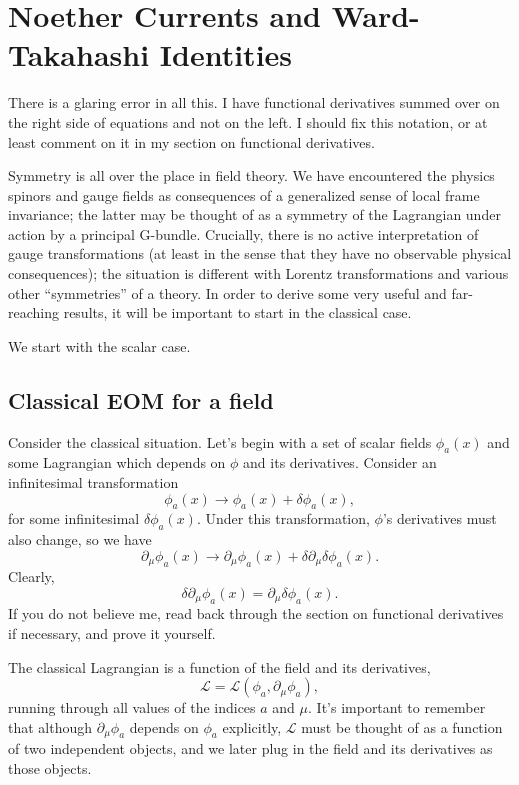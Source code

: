 \documentclass[main.tex]{subfiles}
\begin{document}
\chapter{Noether Currents and Ward-Takahashi Identities}

There is a glaring error in all this. I have functional derivatives summed over on the right side of equations and not on the left. I should fix this notation, or at least comment on it in my section on functional derivatives.


Symmetry is all over the place in field theory. We have encountered the physics spinors and gauge fields as consequences of a generalized sense of local frame invariance; the latter may be thought of as a symmetry of the Lagrangian under action by a principal G-bundle. Crucially, there is no active interpretation of gauge transformations (at least in the sense that they have no observable physical consequences); the situation is different with Lorentz transformations and various other ``symmetries'' of a theory. In order to derive some very useful and far-reaching results, it will be important to start in the classical case.

We start with the scalar case.
\section{Classical EOM for a field}
Consider the classical situation. Let's begin with a set of scalar fields $\phi_a(x)$ and some Lagrangian which depends on $\phi$ and its derivatives. Consider an infinitesimal transformation
\begin{equation} \label{varphi}
\phi_a (x) \to \phi_a(x) + \delta \phi_a (x),
\end{equation}
for some infinitesimal $\delta \phi_a(x)$. Under this transformation, $\phi$'s derivatives must also change, so we have
\[
\partial_\mu \phi_a(x) \to \partial_\mu \phi_a(x) + \delta \partial_\mu \delta \phi_a (x).
\]
Clearly,
\[
\delta \partial_\mu \phi_a (x)=\partial_\mu \delta \phi_a (x).
\]
If you do not believe me, read back through the section on functional derivatives if necessary, and prove it yourself. 

The classical Lagrangian is a function of the field and its derivatives,
\[
\mathcal{L} = \mathcal{L} (\phi_a, \partial_\mu \phi_a),
\]
running through all values of the indices $a$ and $\mu$. It's important to remember that although $\partial_\mu \phi_a$ depends on $\phi_a$ explicitly, $\mathcal{L}$ must be thought of as a function of two independent objects, and we later plug in the field and its derivatives as those objects.
\end{document}
